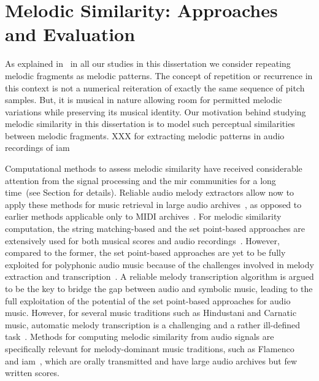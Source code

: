 


\section{Melodic Similarity: Approaches and Evaluation}
\label{sec:patterns_evaluation_of_similarity_measures}

As explained in~ in all our studies in this dissertation we consider repeating melodic fragments as melodic patterns. The concept of repetition or recurrence in this context is not a numerical reiteration of exactly the same sequence of pitch samples. But, it is musical in nature allowing room for permitted melodic variations while preserving its musical identity. Our motivation behind studying melodic similarity in this dissertation is to model such perceptual similarities between melodic fragments. XXX for extracting melodic patterns in audio recordings of \gls{iam}

Computational methods to assess melodic similarity have received considerable attention from the signal processing and the \gls{mir} communities for a long time~\citep{ghias1995query,hewlett1998melodic,casey2008content,typke2007music}(see Section  for details). Reliable audio melody extractors allow now to apply these methods for music retrieval in large audio archives~\citep{ryynanen2008query,zhu2003warping}, as opposed to earlier methods applicable only to MIDI archives~\citep{RBDannenberg2007QBH}. For melodic similarity computation, the string matching-based and the set point-based approaches are extensively used for both musical scores and audio recordings~\cite{typke2007music}. However, compared to the former, the set point-based approaches are yet to be fully exploited for polyphonic audio music because of the challenges involved in melody extraction and transcription~\cite{collins2014bridging}. A reliable melody transcription algorithm is argued to be the key to bridge the gap between audio and symbolic music, leading to the full exploitation of the potential of the set point-based approaches for audio music. However, for several music traditions such as Hindustani and Carnatic music, automatic melody transcription is a challenging and a rather ill-defined task~\cite{Rao2012}. Methods for computing melodic similarity from audio signals are specifically relevant for melody-dominant music traditions, such as Flamenco~\citep{pikrakis2012tracking} and \gls{iam}~\citep{Rao2014}, which are orally transmitted and have large audio archives but few written scores. 

